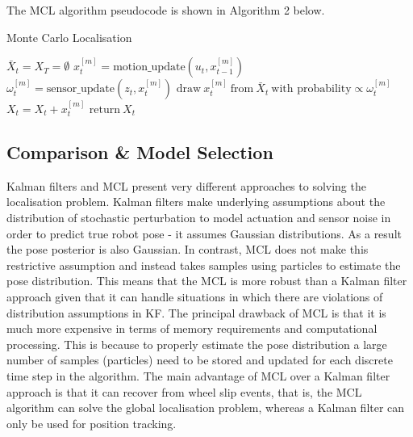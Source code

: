 \documentclass[a4paper]{article}
\begin{document}
The MCL algorithm pseudocode is shown in Algorithm 2 below.
\begin{algorithm}
\caption{Monte Carlo Localisation}
\begin{algorithmic}[1]
\State $\bar{X}_t = X_T = \emptyset$
	\State $x^{[m]}_t = \text{motion\_update}(u_t, x^{[m]}_{t-1})$
	\State $\omega^{[m]}_t = \text{sensor\_update}(z_t, x^{[m]}_t)$
\EndFor
{}
	\State $\text{draw} \ x^{[m]}_t \ \text{from} \  \bar{X}_t \ \text{with probability} \propto \omega^{[m]}_t$
	\State $X_t = X_t + x^{[m]}_t$
\EndFor
\State $\text{return} \ X_t$
\EndProcedure
\end{algorithmic}
\end{algorithm}

\subsection{Comparison \& Model Selection}
Kalman filters and MCL present very different approaches to solving the localisation problem. Kalman filters make underlying assumptions about the distribution of stochastic perturbation to model actuation and sensor noise in order to predict true robot pose - it assumes Gaussian distributions. As a result the pose posterior is also Gaussian. In contrast, MCL does not make this restrictive assumption and instead takes samples using particles to estimate the pose distribution. This means that the MCL is more robust than a Kalman filter approach given that it can handle situations in which there are violations of distribution assumptions in KF. The principal drawback of MCL is that it is much more expensive in terms of memory requirements and computational processing. This is because to properly estimate the pose distribution a large number of samples (particles) need to be stored and updated for each discrete time step in the algorithm. The main advantage of MCL over a Kalman filter approach is that it can recover from wheel slip events, that is, the MCL algorithm can solve the global localisation problem, whereas a Kalman filter can only be used for position tracking. 

\newpage
\end{document}
